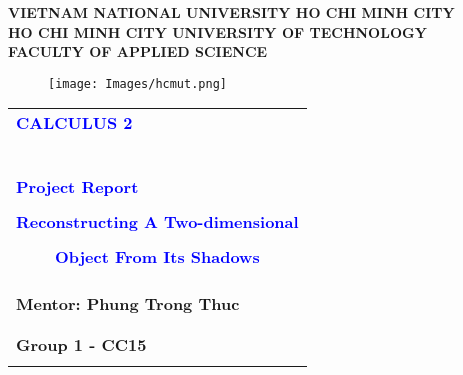 \documentclass[a4paper]{article}
\begin{document}
\begin{titlepage}

\begin{center}
\textbf{\Large VIETNAM NATIONAL UNIVERSITY HO CHI MINH CITY} \\

\vspace{7pt}
\textbf{\Large HO CHI MINH CITY UNIVERSITY OF TECHNOLOGY} \\

\vspace{7pt}
\textbf{\Large FACULTY OF APPLIED SCIENCE}
\end{center}

\vspace{1cm}

\begin{figure}[h!]
\begin{center}
\texttt{[image: Images/hcmut.png]}
\end{center}
\end{figure}

\vspace{1cm}


\begin{center}
\begin{tabular}{ccc}
	\multicolumn{3}{l}{\textbf{{\Large \textcolor{blue}{CALCULUS 2}}}}\\
	~~\\
	\arrayrulecolor{blue}\hline
	\\
	\multicolumn{3}{l}{\textbf{{\Large \textcolor{blue}{Project Report} }}}\\
	\\
	
	\multicolumn{3}{c}{\textbf{{\Huge \textcolor{blue}{Reconstructing A Two-dimensional  }}}}\\
	\\

    \multicolumn{3}{c}{\textbf{{\Huge \textcolor{blue}{Object From Its Shadows}}}}\\
	\\
	\arrayrulecolor{blue}\hline \\ \\

    \multicolumn{1}{l}{\textbf{\Large Mentor: Phung Trong Thuc}} \\
    \\ \\
    \multicolumn{1}{l}{\textbf{\Large Group 1 - CC15}} \\ \\
    

\end{tabular}
\end{center}
\end{titlepage}
\end{document}
